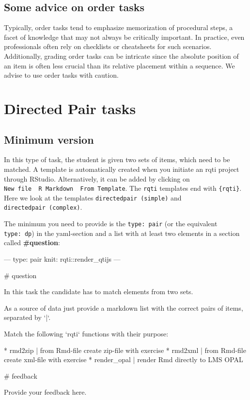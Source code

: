 \documentclass[twoside]{tufte-book}
\newenvironment{Shaded}{}{}
\begin{document}
\section{Some advice on order tasks}\label{some-advice-on-order-tasks}

Typically, order tasks tend to emphasize memorization of procedural steps, a facet of knowledge that may not always be critically important. In practice, even professionals often rely on checklists or cheatsheets for such scenarios. Additionally, grading order tasks can be intricate since the absolute position of an item is often less crucial than its relative placement within a sequence. We advise to use order tasks with caution.

\chapter{Directed Pair tasks}\label{directed-pair-tasks}

\section{Minimum version}\label{minimum-version-6}

In this type of task, the student is given two sets of items, which need to be matched. A template is automatically created when you initiate an rqti project through RStudio. Alternatively, it can be added by clicking on \texttt{New\ file\ \textrightarrow{}\ R\ Markdown\ \textrightarrow{}\ From\ Template}. The \texttt{rqti} templates end with \texttt{\{rqti\}}. Here we look at the templates \texttt{directedpair\ (simple)} and \texttt{directedpair\ (complex)}.

The minimum you need to provide is the \texttt{type:\ pair} (or the equivalent \texttt{type:\ dp}) in the yaml-section and a list with at least two elements in a section called \textbf{\#question}:

\begin{Shaded}
\begin{Highlighting}
---
type: pair
knit: rqti::render_qtijs
---

# question

In this task the candidate has to match elements from two sets.

As a source of data just provide a markdown list with the correct pairs of
items, separated by `|`.

Match the following `rqti` functions with their purpose:

* rmd2zip | from Rmd-file create zip-file with exercise
* rmd2xml | from Rmd-file create xml-file with exercise
* render_opal | render Rmd directly to LMS OPAL

# feedback

Provide your feedback here.
\end{Highlighting}
\end{Shaded}
\end{document}

